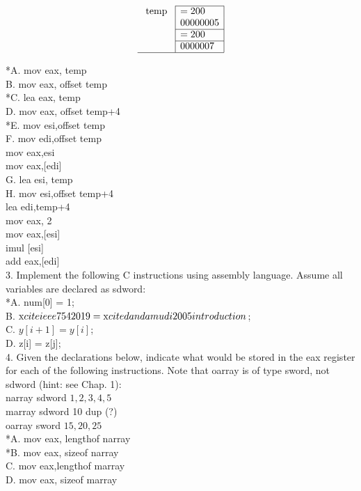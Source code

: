 \documentclass[10pt]{book}
\begin{document}
$$
\begin{array}{r|l|}
\cline { 2 - 2 } \text { temp } & =200 \\
& 00000005 \\
\cline { 2 - 2 } & =200 \\
\cline { 2 - 2 } & 0000007 \\
\hline
\end{array}
$$

*A. mov eax, temp\\
B. mov eax, offset temp\\
*C. lea eax, temp\\
D. mov eax, offset temp+4\\
*E. mov esi,offset temp\\
F. mov edi,offset temp\\
mov eax,esi\\[0pt]
mov eax,[edi]\\
G. lea esi, temp\\
H. mov esi,offset temp+4\\
lea edi,temp+4\\
mov eax, 2\\[0pt]
mov eax,[esi]\\[0pt]
imul [esi]\\[0pt]
add eax,[edi]\\
3. Implement the following C instructions using assembly language. Assume all variables are declared as sdword:\\[0pt]
*A. num[0] = 1;\\
B. $\mathrm{x}\\cite{ieee7542019}=\mathrm{x}\\cite{dandamudi2005introduction}$;\\
C. $y[i+1]=y[i]$;\\[0pt]
D. z[i] = z[j];\\
4. Given the declarations below, indicate what would be stored in the eax register for each of the following instructions. Note that oarray is of type sword, not sdword (hint: see Chap. 1):\\
narray sdword $1,2,3,4,5$\\
marray sdword 10 dup (?)\\
oarray sword $15,20,25$\\
*A. mov eax, lengthof narray\\
*B. mov eax, sizeof narray\\
C. mov eax,lengthof marray\\
D. mov eax, sizeof marray\\
\end{document}
